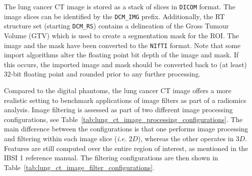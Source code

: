 \documentclass[fleqn,a4paper,oneside,openany]{book}
\begin{document}
The lung cancer CT image is stored as a stack of slices in \texttt{DICOM} format. The image slices can be identified by the \texttt{DCM\_IMG} prefix. Additionally, the RT structure set (starting \texttt{DCM\_RS}) contains a delineation of the Gross Tumour Volume (GTV) which is used to create a segmentation mask for the ROI. The image and the mask have been converted to the \texttt{NIfTI} format. Note that some import algorithms alter the floating point bit depth of the image and mask. If this occurs, the imported image and mask should be converted back to (at least) 32-bit floating point and rounded prior to any further processing.

Compared to the digital phantoms, the lung cancer CT image offers a more realistic setting to benchmark applications of image filters as part of a radiomics analysis. Image filtering is assessed as part of two different image processing configurations, see Table~\ref{tab:lung_ct_image_processing_configurations}. The main difference between the configurations is that one performs image processing and filtering within each image slice (\textit{i.e.} 2$D$), whereas the other operates in 3$D$. Features are still computed over the entire region of interest, as mentioned in the IBSI 1 reference manual. The filtering configurations are then shown in Table~\ref{tab:lung_ct_image_filter_configurations}.
\end{document}
